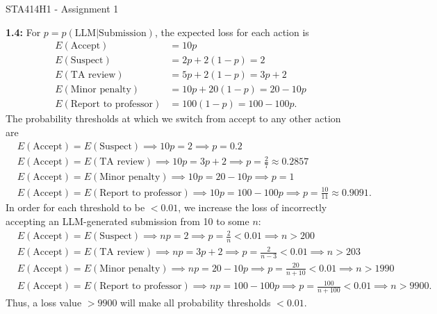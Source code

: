 \documentclass[12pt]{article}
\begin{document}
\begin{center}
{\Large STA414H1 - Assignment 1}
\end{center}

\textbf{1.4:} For $p=p(\text{LLM}|\text{Submission})$, the expected loss for each action is \begin{align*}
    E(\text{Accept}) &= 10p\\
    E(\text{Suspect}) &= 2p+2(1-p)=2\\
    E(\text{TA review}) &= 5p+2(1-p)=3p+2\\
    E(\text{Minor penalty}) &= 10p+20(1-p)=20-10p\\
    E(\text{Report to professor}) &= 100(1-p)=100-100p.
\end{align*} The probability thresholds at which we switch from accept to any other action are \begin{align*}
    &E(\text{Accept}) = E(\text{Suspect}) \implies 10p=2 \implies p=0.2\\
    &E(\text{Accept}) = E(\text{TA review}) \implies 10p=3p+2 \implies p=\frac{2}{7}\approx 0.2857\\
    &E(\text{Accept}) = E(\text{Minor penalty}) \implies 10p=20-10p \implies p=1\\
    &E(\text{Accept}) = E(\text{Report to professor}) \implies 10p=100-100p \implies p=\frac{10}{11}\approx 0.9091.
\end{align*} In order for each threshold to be $<0.01$, we increase the loss of incorrectly accepting an LLM-generated submission from 10 to some $n$: \begin{align*}
    &E(\text{Accept}) = E(\text{Suspect}) \implies np=2 \implies p=\frac{2}{n}<0.01 \implies n>200\\
    &E(\text{Accept}) = E(\text{TA review}) \implies np=3p+2 \implies p=\frac{2}{n-3}<0.01 \implies n>203\\
    &E(\text{Accept}) = E(\text{Minor penalty}) \implies np=20-10p \implies p=\frac{20}{n+10}<0.01 \implies n>1990\\
    &E(\text{Accept}) = E(\text{Report to professor}) \implies np=100-100p \implies p=\frac{100}{n+100}<0.01 \implies n>9900.
\end{align*} Thus, a loss value $>9900$ will make all probability thresholds $<0.01$.
\end{document}
